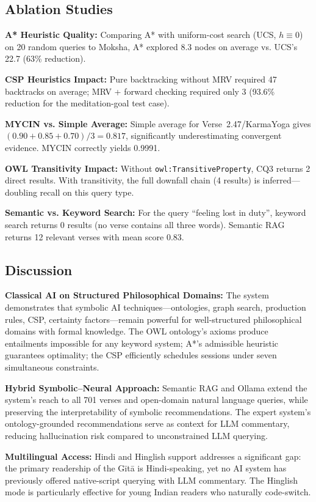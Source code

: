 \documentclass[conference]{IEEEtran}
\begin{document}
\subsection{Ablation Studies}

\textbf{A* Heuristic Quality:} Comparing A* with uniform-cost search (UCS,
$h \equiv 0$) on 20 random queries to Moksha, A* explored 8.3 nodes on
average vs. UCS's 22.7 (63\% reduction).

\textbf{CSP Heuristics Impact:} Pure backtracking without MRV required 47
backtracks on average; MRV + forward checking required only 3 (93.6\%
reduction for the meditation-goal test case).

\textbf{MYCIN vs. Simple Average:} Simple average for Verse~2.47/KarmaYoga
gives $(0.90 + 0.85 + 0.70)/3 = 0.817$, significantly underestimating
convergent evidence. MYCIN correctly yields 0.9991.

\textbf{OWL Transitivity Impact:} Without \texttt{owl:TransitiveProperty},
CQ3 returns 2 direct results. With transitivity, the full downfall chain
(4 results) is inferred—doubling recall on this query type.

\textbf{Semantic vs. Keyword Search:} For the query ``feeling lost in duty'',
keyword search returns 0 results (no verse contains all three words).
Semantic RAG returns 12 relevant verses with mean score 0.83.

\subsection{Discussion}

\textbf{Classical AI on Structured Philosophical Domains:} The system
demonstrates that symbolic AI techniques—ontologies, graph search, production
rules, CSP, certainty factors—remain powerful for well-structured philosophical
domains with formal knowledge. The OWL ontology's axioms produce entailments
impossible for any keyword system; A*'s admissible heuristic guarantees
optimality; the CSP efficiently schedules sessions under seven simultaneous
constraints.

\textbf{Hybrid Symbolic--Neural Approach:} Semantic RAG and Ollama extend the
system's reach to all 701 verses and open-domain natural language queries, while
preserving the interpretability of symbolic recommendations. The expert system's
ontology-grounded recommendations serve as context for LLM commentary, reducing
hallucination risk compared to unconstrained LLM querying.

\textbf{Multilingual Access:} Hindi and Hinglish support addresses a significant
gap: the primary readership of the G\={i}t\={a} is Hindi-speaking, yet no AI system
has previously offered native-script querying with LLM commentary. The Hinglish
mode is particularly effective for young Indian readers who naturally code-switch.
\end{document}
